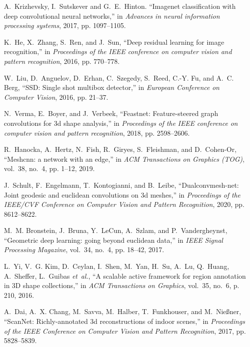 \begin{thebibliography}{1}

A.~Krizhevsky, I.~Sutskever and G.~E.~Hinton. 
``Imagenet classification with deep convolutional neural networks,'' in
\emph{Advances in neural information processing systems}, 2017, pp. 1097–1105. 

K.~He, X.~Zhang, S.~Ren, and J.~Sun, ``Deep residual learning for image
  recognition,'' in \emph{Proceedings of the IEEE conference on computer vision
  and pattern recognition}, 2016, pp. 770--778.

W.~Liu, D.~Anguelov, D.~Erhan, C.~Szegedy, S.~Reed, C.-Y. Fu, and A.~C. Berg,
  ``{SSD}: Single shot multibox detector,'' in \emph{European Conference on
  Computer Vision}, 2016, pp. 21--37.

N.~Verma, E.~Boyer, and J.~Verbeek, ``Feastnet: Feature-steered graph
  convolutions for 3d shape analysis,'' in \emph{Proceedings of the IEEE
  conference on computer vision and pattern recognition}, 2018, pp. 2598--2606.

R.~Hanocka, A.~Hertz, N.~Fish, R.~Giryes, S.~Fleishman, and D.~Cohen-Or,
  ``Meshcnn: a network with an edge,'' in \emph{ACM Transactions on Graphics
  (TOG)}, vol.~38, no.~4, pp. 1--12, 2019.

J.~Schult, F.~Engelmann, T.~Kontogianni, and B.~Leibe, ``Dualconvmesh-net:
  Joint geodesic and euclidean convolutions on 3d meshes,'' in
  \emph{Proceedings of the IEEE/CVF Conference on Computer Vision and Pattern
  Recognition}, 2020, pp. 8612--8622.

M.~M. Bronstein, J.~Bruna, Y.~LeCun, A.~Szlam, and P.~Vandergheynst,
  ``Geometric deep learning: going beyond euclidean data,'' in \emph{IEEE Signal
  Processing Magazine}, vol.~34, no.~4, pp. 18--42, 2017.

L.~Yi, V.~G. Kim, D.~Ceylan, I.~Shen, M.~Yan, H.~Su, A.~Lu, Q.~Huang,
  A.~Sheffer, L.~Guibas \emph{et~al.}, ``A scalable active framework for region
  annotation in {3D} shape collections,'' in \emph{ACM Transactions on Graphics},
  vol.~35, no.~6, p. 210, 2016.

A.~Dai, A.~X. Chang, M.~Savva, M.~Halber, T.~Funkhouser, and M.~Nie{\ss}ner,
  ``{ScanNet}: Richly-annotated 3d reconstructions of indoor scenes,'' in
  \emph{Proceedings of the IEEE Conference on Computer Vision and Pattern
  Recognition}, 2017, pp. 5828--5839.


\end{thebibliography}
